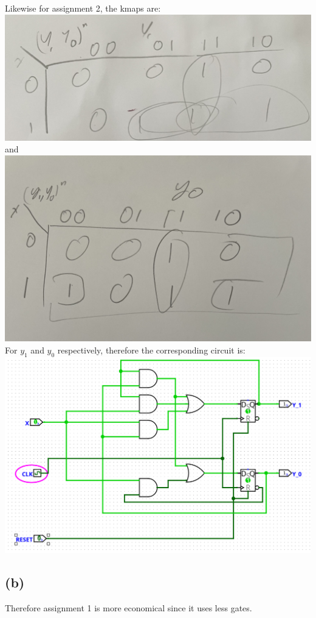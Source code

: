 \documentclass[12pt]{article}
\begin{document}
Likewise for assignment 2, the kmaps are:\\
\includegraphics[scale=0.1]{Q3A2Y1.jpg}\\
and\\
\includegraphics[scale=0.1]{Q3A2Y0.jpg}\\
For $y_1$ and $y_0$ respectively, therefore the corresponding circuit is:\\
\includegraphics[scale=0.3]{Q3circuit2.png}
\subsection*{(b)}
Therefore assignment 1 is more economical since it uses less gates.
\end{document}
